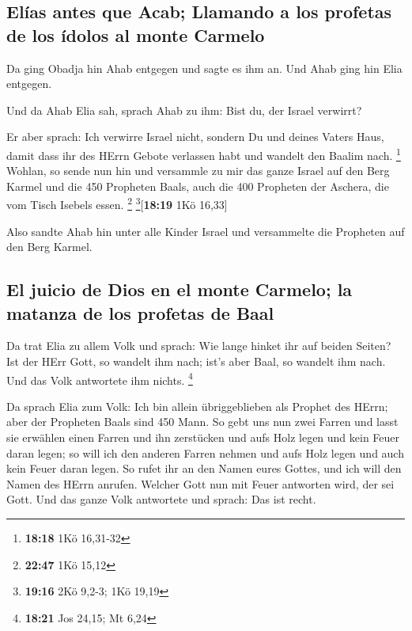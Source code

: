 \hypertarget{eluxedas-antes-que-acab-llamando-a-los-profetas-de-los-uxeddolos-al-monte-carmelo}{%
\subsection{Elías antes que Acab; Llamando a los profetas de los ídolos
al monte
Carmelo}\label{eluxedas-antes-que-acab-llamando-a-los-profetas-de-los-uxeddolos-al-monte-carmelo}}

 Da ging Obadja hin Ahab entgegen und sagte es ihm an.
Und Ahab ging hin Elia entgegen.

 Und da Ahab Elia sah, sprach Ahab zu ihm: Bist du, der
Israel verwirrt?

 Er aber sprach: Ich verwirre Israel nicht, sondern Du
und deines Vaters Haus, damit dass ihr des HErrn Gebote verlassen habt
und wandelt den Baalim nach. \footnote{\textbf{18:18} 1Kö 16,31-32}
 Wohlan, so sende nun hin und versammle zu mir das ganze
Israel auf den Berg Karmel und die 450 Propheten Baals, auch die 400
Propheten der Aschera, die vom Tisch Isebels essen. \footnote{\textbf{22:47}
  1Kö 15,12} \footnote{\textbf{19:16} 2Kö 9,2-3; 1Kö 19,19}{[}\textbf{18:19}
1Kö 16,33{]}

 Also sandte Ahab hin unter alle Kinder Israel und
versammelte die Propheten auf den Berg Karmel.

\hypertarget{el-juicio-de-dios-en-el-monte-carmelo-la-matanza-de-los-profetas-de-baal}{%
\subsection{El juicio de Dios en el monte Carmelo; la matanza de los
profetas de
Baal}\label{el-juicio-de-dios-en-el-monte-carmelo-la-matanza-de-los-profetas-de-baal}}

 Da trat Elia zu allem Volk und sprach: Wie lange hinket
ihr auf beiden Seiten? Ist der HErr Gott, so wandelt ihm nach; ist's
aber Baal, so wandelt ihm nach. Und das Volk antwortete ihm nichts.
\footnote{\textbf{18:21} Jos 24,15; Mt 6,24}

 Da sprach Elia zum Volk: Ich bin allein übriggeblieben
als Prophet des HErrn; aber der Propheten Baals sind 450 Mann.
 So gebt uns nun zwei Farren und lasst sie erwählen einen
Farren und ihn zerstücken und aufs Holz legen und kein Feuer daran
legen; so will ich den anderen Farren nehmen und aufs Holz legen und
auch kein Feuer daran legen.  So rufet ihr an den Namen
eures Gottes, und ich will den Namen des HErrn anrufen. Welcher Gott nun
mit Feuer antworten wird, der sei Gott. Und das ganze Volk antwortete
und sprach: Das ist recht.

